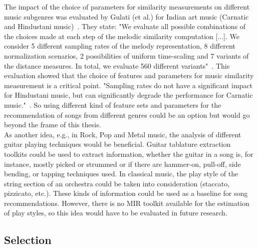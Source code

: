 The impact of the choice of parameters for similarity measurements on different music subgenres was evaluated by Gulati (et al.) for Indian art music (Carnatic and Hindustani music)~\cite{mussim1}. They state: "We evaluate all possible combinations of the choices made at each step of the melodic similarity computation [...].  We consider 5 different sampling rates of the melody representation, 8 different normalization scenarios, 2 possibilities of uniform time-scaling and 7 variants of the distance measures.  In total, we evaluate 560 different variants"~\cite[p. 3]{mussim1}. This evaluation showed that the choice of features and parameters for music similarity measurement is a critical point. "Sampling rates do not have a significant impact for Hindustani music, but can significantly degrade the performance for Carnatic music."~\cite[p. 3]{mussim1}. So using different kind of feature sets and parameters for the recommendation of songs from different genres could be an option but would go beyond the frame of this thesis.\\
As another idea, e.g., in Rock, Pop and Metal music, the analysis of different guitar playing techniques would be beneficial. Guitar tablature extraction~\cite{guitext1} toolkits could be used to extract information, whether the guitar in a song is, for instance, mostly picked or strummed or if there are hammer-on, pull-off, side bending, or tapping techniques used. In classical music, the play style of the string section of an orchestra could be taken into consideration (staccato, pizzicato, etc.). These kinds of information could be used as a baseline for song recommendations. 
However, there is no MIR toolkit available for the estimation of play styles, so this idea would have to be evaluated in future research.

\subsection{Selection}

